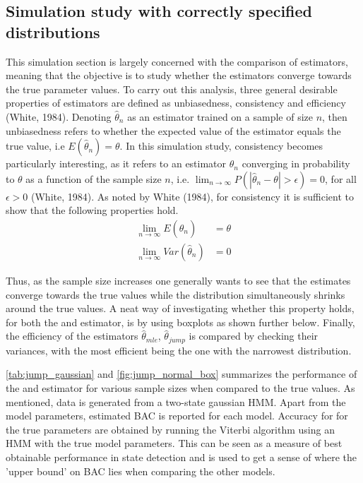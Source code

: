 \subsection{Simulation study with correctly specified distributions}
\label{section:simulation_corspeciffied}

This simulation section is largely concerned with the comparison of estimators, meaning that the objective is to study whether the estimators converge towards the true parameter values. To carry out this analysis, three general desirable properties of estimators are defined as unbiasedness, consistency and efficiency (White, 1984). Denoting $\hat\theta_n$ as an estimator trained on a sample of size $n$, then unbiasedness refers to whether the expected value of the estimator equals the true value, i.e $E(\hat\theta_n)=\theta$. In this simulation study, consistency becomes particularly interesting, as it refers to an estimator $\hat\theta_n$ converging in probability to $\theta$ as a function of the sample size $n$, i.e. $\lim_{n\to\infty}P(|\hat\theta_n - \theta|>\epsilon) = 0$, for all $\epsilon>0$ (White, 1984). As noted by White (1984), for consistency it is sufficient to show that the following properties hold.
\begin{align}
    \lim_{n\to\infty} E(\hat\theta_n) &= \theta \\
    \lim_{n\to\infty} Var(\hat\theta_n) &= 0
\label{eq:sim_consistency}
\end{align}

Thus, as the sample size increases one generally wants to see that the estimates converge towards the true values while the distribution simultaneously shrinks around the true values. A neat way of investigating whether this property holds, for both the \mle and \jump estimator, is by using boxplots as shown further below. Finally, the efficiency of the estimators $\hat\theta_{mle}$, $\hat\theta_{jump}$ is compared by checking their variances, with the most efficient being the one with the narrowest distribution.

\cref{tab:jump_gaussian} and \cref{fig:jump_normal_box} summarizes the performance of the \mle and \jump estimator for various sample sizes when compared to the true values. As mentioned, data is generated from a two-state gaussian HMM. Apart from the model parameters, estimated BAC is reported for each model. Accuracy for for the true parameters are obtained by running the Viterbi algorithm using an HMM with the true model parameters. This can be seen as a measure of best obtainable performance in state detection and is used to get a sense of where the 'upper bound' on BAC lies when comparing the other models.

